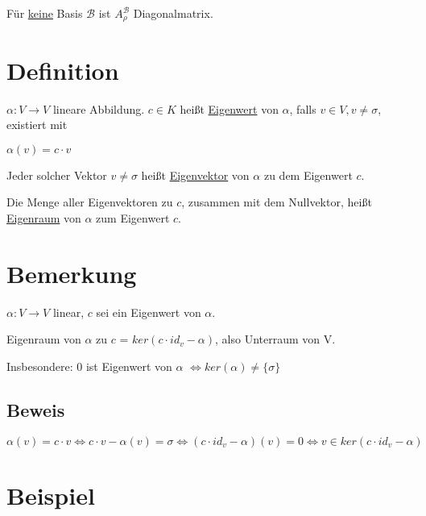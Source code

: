 \documentclass[a4paper, openany]{book}
\begin{document}
        Für \underline{keine} Basis $\mathcal{B}$ ist $A_{\rho}^{\mathcal{B}}$ Diagonalmatrix.

        \section{Definition}

        $\alpha : V \rightarrow V$ lineare Abbildung. $c \in K$ heißt \underline{Eigenwert} von $\alpha$, falls $v \in V, v \neq \sigma$, existiert mit 

        \begin{center}
          $\alpha(v) = c \cdot v$ 
        \end{center}

        Jeder solcher Vektor $v \neq \sigma$ heißt \underline{Eigenvektor} von $\alpha$ zu dem Eigenwert $c$.

        \par \medskip

        Die Menge aller Eigenvektoren zu $c$, zusammen mit dem Nullvektor, heißt \underline{Eigenraum} von $\alpha$ zum Eigenwert $c$.

        \section{Bemerkung}

        $\alpha: V \rightarrow V$ linear, $c$ sei ein Eigenwert von $\alpha$. 

        \par \medskip

        Eigenraum von $\alpha$ zu $c$ = $ker(c \cdot id_v - \alpha)$, also Unterraum von V.

        \par \medskip

        Insbesondere: 0 ist Eigenwert von $\alpha$ $\Leftrightarrow ker(\alpha) \neq \{\sigma\}$

        \subsection{Beweis}

        $\alpha(v) = c \cdot v \Leftrightarrow c \cdot v - \alpha(v) = \sigma \Leftrightarrow (c \cdot id_v - \alpha) (v) = 0 \Leftrightarrow v \in ker(c \cdot id_v - \alpha)$

        \section{Beispiel}
\end{document}
